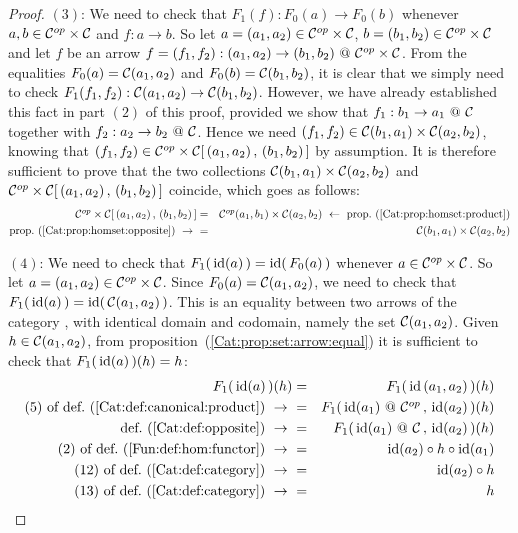 \begin{proof}
    $(3)$: We need to check that $F_{1}(f):F_{0}(a)\to F_{0}(b)$ whenever
    $a,b\in\mbox{${\cal C}^{op}$}\times\mbox{$\cal C$}$ and $f:a\to b$. So let $a=(a_{1},a_{2})\in\mbox{${\cal C}^{op}$}
    \times\mbox{$\cal C$}$, $b=(b_{1},b_{2})\in\mbox{${\cal C}^{op}$}\times\mbox{$\cal C$}$ and let $f$ be an 
    arrow $f=(f_{1},f_{2}):(a_{1},a_{2})\to(b_{1},b_{2})\ @\ \Cop\times\Cat$. 
    From the equalities $F_{0}(a)=\mbox{$\cal C$}(a_{1},a_{2})$ and $F_{0}(b)=\mbox{$\cal C$}
    (b_{1},b_{2})$, it is clear that we simply need to check 
    $F_{1}(f_{1},f_{2}):\mbox{$\cal C$}(a_{1},a_{2})\to \mbox{$\cal C$}(b_{1},b_{2})$.
    However, we have already established this fact in part $(2)$ of this 
    proof, provided we show that $f_{1}:b_{1}\to a_{1}\ @\ \mbox{$\cal C$}$ together 
    with $f_{2}:a_{2}\to b_{2}\ @\ \mbox{$\cal C$}$. Hence we need
    $(f_{1},f_{2})\in\mbox{$\cal C$}(b_{1},a_{1})\times\mbox{$\cal C$}(a_{2},b_{2})$, knowing
    that $(f_{1},f_{2})\in\mbox{${\cal C}^{op}$}\times\mbox{$\cal C$}[\,(a_{1},a_{2})\,,\,(b_{1},b_{2})
    \,]$ by assumption. It is therefore sufficient to prove that the 
    two collections $\mbox{$\cal C$}(b_{1},a_{1})\times\mbox{$\cal C$}(a_{2},b_{2})$ and
    $\mbox{${\cal C}^{op}$}\times\mbox{$\cal C$}[\,(a_{1},a_{2})\,,\,(b_{1},b_{2})\,]$ coincide, which 
    goes as follows:
        \begin{eqnarray*}\Cop\times\Cat[\,(a_{1},a_{2})\,,\,(b_{1},b_{2})\,]
            &=&\Cop(a_{1},b_{1})\times\Cat(a_{2},b_{2})\ \leftarrow\ 
            \mbox{prop.~(\ref{Cat:prop:homset:product})}\\
            \mbox{prop.~(\ref{Cat:prop:homset:opposite})}\ \to\ 
            &=&\Cat(b_{1},a_{1})\times\Cat(a_{2},b_{2})
        \end{eqnarray*}

    $(4)$: We need to check that $F_{1}(\,\mbox{\rm id}(a)\,)=\mbox{\rm id}(\,F_{0}(a)\,)$ whenever
    $a\in\mbox{${\cal C}^{op}$}\times\mbox{$\cal C$}$. So let $a=(a_{1},a_{2})\in\mbox{${\cal C}^{op}$}\times\mbox{$\cal C$}$. Since
    $F_{0}(a)=\mbox{$\cal C$}(a_{1},a_{2})$, we need to check that $F_{1}(\,\mbox{\rm id}(a)\,)
    =\mbox{\rm id}(\,\mbox{$\cal C$}(a_{1},a_{2})\,)$. This is an equality between two arrows
    of the category \Set, with identical domain and codomain, namely the set 
    $\mbox{$\cal C$}(a_{1},a_{2})$. Given $h\in\mbox{$\cal C$}(a_{1},a_{2})$, 
    from proposition~(\ref{Cat:prop:set:arrow:equal})
    it is sufficient to 
    check that $F_{1}(\,\mbox{\rm id}(a)\,)(h)=h$:
        \begin{eqnarray*}F_{1}(\,\id(a)\,)(h)
            &=&F_{1}(\,\id\,(a_{1},a_{2})\,)(h)\\
            \mbox{$(5)$ of def.~(\ref{Cat:def:canonical:product})}\ \to\ 
            &=&F_{1}(\,\id(a_{1})\ @\ \Cop\,,\,\id(a_{2})\,)(h)\\
            \mbox{def.~(\ref{Cat:def:opposite})}\ \to\ 
            &=&F_{1}(\,\id(a_{1})\ @\ \Cat\,,\,\id(a_{2})\,)(h)\\
            \mbox{$(2)$ of def.~(\ref{Fun:def:hom:functor})}\ \to\ 
            &=&\id(a_{2})\circ h\circ \id(a_{1})\\
            \mbox{$(12)$ of def.~(\ref{Cat:def:category})}\ \to\ 
            &=&\id(a_{2})\circ h\\
            \mbox{$(13)$ of def.~(\ref{Cat:def:category})}\ \to\ 
            &=&h
        \end{eqnarray*}


\end{proof}
